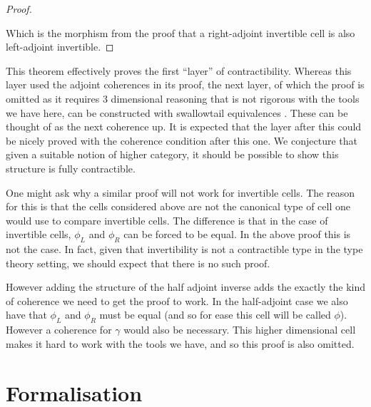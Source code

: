 \documentclass{article}
\theoremstyle{definition}
\theoremstyle{remark}
\newcommand{\rinv}[1]{#1^\star}
\begin{document}
\begin{proof}
\begin{center}
  \end{center}

  Which is the morphism from the proof that a right-adjoint invertible cell is also left-adjoint invertible.
\end{proof}

This theorem effectively proves the first ``layer'' of contractibility. Whereas this layer used the adjoint coherences in its proof, the next layer, of which the proof is omitted as it requires 3 dimensional reasoning that is not rigorous with the tools we have here, can be constructed with swallowtail equivalences . These can be thought of as the next coherence up. It is expected that the layer after this could be nicely proved with the coherence condition after this one. We conjecture that given a suitable notion of higher category, it should be possible to show this structure is fully contractible.

One might ask why a similar proof will not work for invertible cells. The reason for this is that the cells considered above are not the canonical type of cell one would use to compare invertible cells. The difference is that in the case of invertible cells, \(\phi_L\) and \(\phi_R\) can be forced to be equal. In the above proof this is not the case. In fact, given that invertibility is not a contractible type in the type theory setting, we should expect that there is no such proof.

However adding the structure of the half adjoint inverse adds the exactly the kind of coherence we need to get the proof to work. In the half-adjoint case we also have that \(\phi_L\) and \(\phi_R\) must be equal (and so for ease this cell will be called \(\phi\)). However a coherence for \(\gamma\) would also be necessary. This higher dimensional cell makes it hard to work with the tools we have, and so this proof is also omitted.

\section{Formalisation}\label{sec:formalisation}
\end{document}
